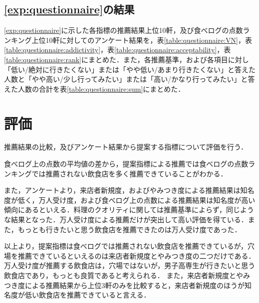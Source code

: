 	\subsection{\ref{exp:questionnaire}の結果}
	\ref{exp:questionnaire}に示した各指標の推薦結果上位10軒，及び食べログの点数ランキング上位10軒に対してのアンケート結果を，表\ref{table:questionnaire:VN}，表\ref{table:questionnaire:addictivity}，表\ref{table:questionnaire:acceptability}，表\ref{table:questionnaire:rank}にまとめた．また，各推薦基準，および各項目に対し「低い/絶対に行きたくない」または「やや低い/あまり行きたくない」と答えた人数と「やや高い/少し行ってみたい」または「高い/かなり行ってみたい」と答えた人数の合計を表\ref{table:questionnaire:sum}にまとめた．
	
	
	
	
	
	\newpage

\section{評価}
推薦結果の比較，及びアンケート結果から提案する指標について評価を行う．\par
食べログ上の点数の平均値の差から，提案指標による推薦では食べログの点数ランキングでは推薦されない飲食店を多く推薦できていることがわかる．\par
また，アンケートより，来店者新規度，およびやみつき度による推薦結果は知名度が低く，万人受け度，および食べログ上の点数による推薦結果は知名度が高い傾向にあるといえる．料理のクオリティに関しては推薦基準によらず，同じような結果となった．万人受け度による推薦だけが突出して高い評価を得ている．また，もっとも行きたいと思う飲食店を推薦できたのは万人受け度であった．\par
以上より，提案指標は食べログでは推薦されない飲食店を推薦できているが，穴場を推薦できているといえるのは来店者新規度とやみつき度の二つだけである．万人受け度が推薦する飲食店は，穴場ではないが，男子高専生が行きたいと思う飲食店であり，もっとも良質であると考えられる．
また，来店者新規度とやみつき度による推薦結果から上位3軒のみを比較すると，来店者新規度のほうが知名度が低い飲食店を推薦できていると言える．
